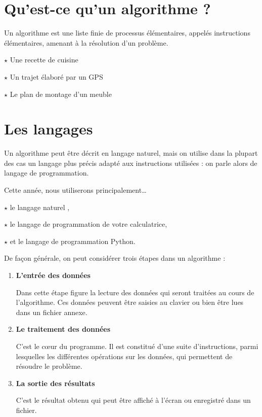 \section{Qu'est-ce qu'un algorithme ?}

\begin{Defi}[]{}
Un algorithme est une liste finie de processus élémentaires, appelés instructions élémentaires, amenant à la
résolution d'un problème.
\end{Defi}

\begin{Exemple}[s]{}
$\star$ Une recette de cuisine

$\star$ Un trajet élaboré par un GPS

$\star$ Le plan de montage d'un meuble
\end{Exemple}

\section{Les langages}

\begin{CadreAlgo}{\linewidth}{}
Un algorithme peut être décrit en langage \og naturel\fg{}, mais on utilise dans la plupart des cas un langage plus
précis adapté aux instructions utilisées : on parle alors de langage de programmation.
\end{CadreAlgo}

Cette année, nous utiliserons principalement\dots

$\star$ le langage \og naturel \fg{},

$\star$ le langage de programmation de votre calculatrice,

$\star$ et le langage de programmation Python.

\medskip

De façon générale, on peut considérer trois étapes dans un algorithme :

\begin{enumerate}
\item \textbf{L'entrée des données}

Dans cette étape figure la lecture des données qui seront traitées au cours de l'algorithme. Ces données peuvent
être saisies au clavier ou bien être lues dans un fichier annexe.

\item \textbf{Le traitement des données}

C'est le cœur du programme. Il est constitué d'une suite d'instructions, parmi lesquelles les différentes opérations
sur les données, qui permettent de résoudre le problème.

\item \textbf{La sortie des résultats}

C'est le résultat obtenu qui peut être affiché à l'écran ou enregistré dans un fichier.

\end{enumerate}